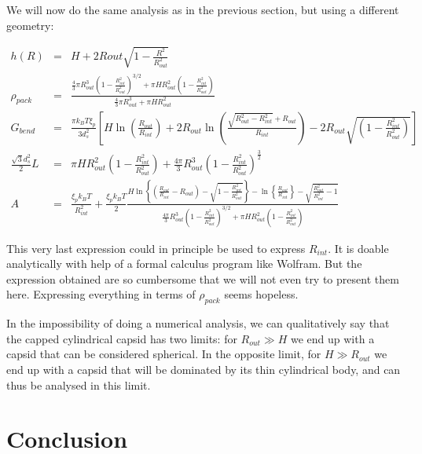 \documentclass{article}
\begin{document}
We will now do the same analysis as in the previous section, but using a different geometry:

\begin{eqnarray}
    h(R) &=& H + 2Rout \sqrt{1 - \frac{R^2}{R_{out}^2}} \\
    \rho_{pack} &=& \frac{ \frac{4}{3}\pi R_{out}^3 \left( 1 - \frac{R_{int}^2}{R_{out}^2} \right)^{3/2} + \pi H R_{out}^2 \left( 1 - \frac{R_{int}^2}{R_{out}^2} \right) }{ \frac{4}{3} \pi R_{out}^3 + \pi H R_{out}^2 } \\
    G_{bend} & = & \frac{\pi k_B T \xi_p}{3 d_s^2} \left[ H \ln \left( \frac{R_{out}}{R_{int}} \right)  + 2R_{out} \ln \left( \frac{\sqrt{R_{out}^2 - R_{int}^2} + R_{out}}{R_{int}} \right) - 2 R_{out} \sqrt{\left( 1 - \frac{R_{int}^2}{R_{out}^2} \right)} \right] \\
    \frac{\sqrt{3}d_s^2}{2} L & = & \pi H R_{out}^2 \left( 1 - \frac{R_{int}^2}{R_{out}^2} \right) + \frac{4\pi}{3} R_{out}^3 \left( 1 - \frac{R_{int}^2}{R_{out}^2} \right)^\frac{3}{2} \\
    A &=& \frac{\xi_p k_B T}{R_{int}^2} + \frac{\xi_p k_B T}{2} \frac{ H \ln \left\{ \left( \frac{R_{out}}{R_{int}} - R_{out}\right) - \sqrt{ 1 - \frac{R_{int}^2}{R_{out}^2}} \right\} - \ln \left\{ \frac{R_{out}}{R_{int}} \right\} - \sqrt{\frac{R_{out}^2}{R_{int}^2}-1}}{\frac{4\pi}{3} R_{out}^3 \left( 1 - \frac{R_{int}^2}{R_{out}^2}\right)^{3/2} + \pi H R_{out}^2 \left( 1 - \frac{R_{int}^2}{R_{out}^2} \right) }
\end{eqnarray}

This very last expression could in principle be used to express $R_{int}$. It is doable analytically with help of a formal calculus program like Wolfram. But the expression obtained are so cumbersome that we will not even try to present them here. Expressing everything in terms of $\rho_{pack}$ seems hopeless.

In the impossibility of doing a numerical analysis, we can qualitatively say that the capped cylindrical capsid has two limits: for $R_{out} \gg H$ we end up with a capsid that can be considered spherical. In the opposite limit, for $H \gg R_{out}$ we end up with a capsid that will be dominated by its thin cylindrical body, and can thus be analysed in this limit.

\newpage
\section{Conclusion}
\end{document}
